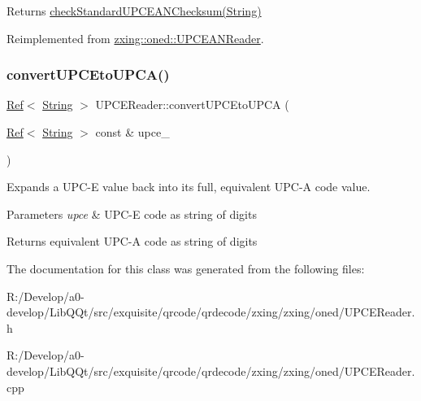 \begin{DoxyReturn}{Returns}
\mbox{\hyperlink{}{check\+Standard\+U\+P\+C\+E\+A\+N\+Checksum(\+String)}} 
\end{DoxyReturn}


Reimplemented from \mbox{\hyperlink{classzxing_1_1oned_1_1_u_p_c_e_a_n_reader_a8dab230e3a380491ddd88447bb583d80}{zxing\+::oned\+::\+U\+P\+C\+E\+A\+N\+Reader}}.

\mbox{\label{classzxing_1_1oned_1_1_u_p_c_e_reader_a3af619d9a00d1102445099bf596a63cc}} 
\subsubsection{\texorpdfstring{convert\+U\+P\+C\+Eto\+U\+P\+C\+A()}{convertUPCEtoUPCA()}}
{\footnotesize\ttfamily \mbox{\hyperlink{classzxing_1_1_ref}{Ref}}$<$ \mbox{\hyperlink{classzxing_1_1_string}{String}} $>$ U\+P\+C\+E\+Reader\+::convert\+U\+P\+C\+Eto\+U\+P\+CA (\begin{DoxyParamCaption}\item[{\mbox{\hyperlink{classzxing_1_1_ref}{Ref}}$<$ \mbox{\hyperlink{classzxing_1_1_string}{String}} $>$ const \&}]{upce\+\_\+ }\end{DoxyParamCaption})\hspace{0.3cm}{\ttfamily [static]}}

Expands a U\+P\+C-\/E value back into its full, equivalent U\+P\+C-\/A code value.


\begin{DoxyParams}{Parameters}
{\em upce} & U\+P\+C-\/E code as string of digits \\
\hline
\end{DoxyParams}
\begin{DoxyReturn}{Returns}
equivalent U\+P\+C-\/A code as string of digits 
\end{DoxyReturn}


The documentation for this class was generated from the following files\+:\begin{DoxyCompactItemize}
\item 
R\+:/\+Develop/a0-\/develop/\+Lib\+Q\+Qt/src/exquisite/qrcode/qrdecode/zxing/zxing/oned/U\+P\+C\+E\+Reader.\+h\item 
R\+:/\+Develop/a0-\/develop/\+Lib\+Q\+Qt/src/exquisite/qrcode/qrdecode/zxing/zxing/oned/U\+P\+C\+E\+Reader.\+cpp\end{DoxyCompactItemize}
